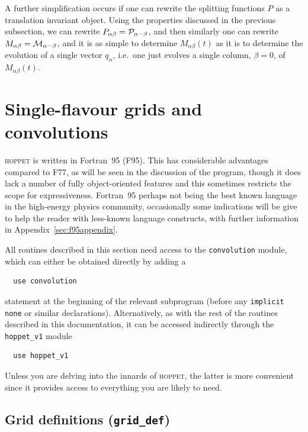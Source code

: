 \documentclass[12pt]{article}
\newcommand{\hoppet}{\textsc{hoppet}\xspace}
\newcommand{\ttt}[1]{\texttt{#1}}
\begin{document}
A further simplification occurs 
if one can rewrite the splitting functions $P$ as
a translation invariant object. Using the properties
discussed in the previous subsection, 
we can rewrite $P_{\alpha\beta} = \cal P_{\alpha-\beta}$,
and then similarly one can rewrite $M_{\alpha\beta} = \cal
M_{\alpha-\beta}$, and it is as simple to determine
$M_{\alpha\beta}(t)$ as it is to determine the evolution of a single
vector $q_\alpha$, i.e.\ one just evolves a single column, $\beta =
0$, of $M_{\alpha\beta}(t)$.



\section{Single-flavour grids and convolutions}
\label{sec:singleflav}


\hoppet is written in Fortran~95 (F95). This has considerable
advantages compared to F77, as will be seen in the discussion of the
program, though it does lack a number of fully object-oriented
features and this sometimes restricts the scope for expressiveness.
Fortran~95 perhaps not being the best known language in the
high-energy physics community, occasionally some indications will be give to
help the reader with less-known language constructs, with further
information in Appendix~\ref{sec:f95appendix}.

All routines described in this section need access to the
\texttt{convolution} module, which can either be obtained directly by
adding a 
\begin{lstlisting}
  use convolution
\end{lstlisting}
statement at the beginning of the relevant subprogram (before
any \ttt{implicit none} or similar declarations). Alternatively, as
with the rest of the routines described in this documentation, it can
be accessed indirectly through the \ttt{hoppet\_v1} module
\begin{lstlisting}
  use hoppet_v1
\end{lstlisting}
Unless you are delving into the innards of  \hoppet, the latter is
more convenient since it provides access to everything you are likely
to need.

\subsection{Grid definitions (\texttt{grid\_def})}
\label{sec:grid}
\end{document}
